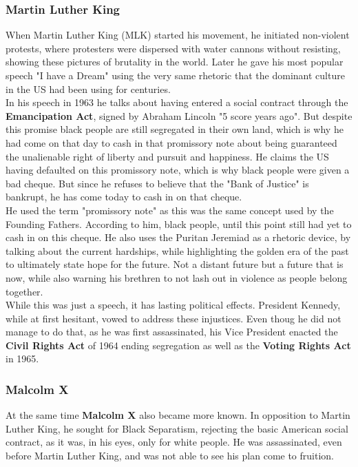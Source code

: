 \documentclass{article}
\begin{document}
	\subsubsection{Martin Luther King}
	When Martin Luther King (MLK) started his movement, he initiated non-violent protests, where protesters were dispersed with water cannons without resisting, showing these pictures of brutality in the world. Later he gave his most popular speech "I have a Dream" using the very same rhetoric that the dominant culture in the US had been using for centuries. \\
	In his speech in 1963 he talks about having entered a social contract through the \textbf{Emancipation Act}, signed by Abraham Lincoln "5 score years ago". But despite this promise black people are still segregated in their own land, which is why he had come on that day to cash in that promissory note about being guaranteed the unalienable right of liberty and pursuit and happiness. He claims the US having defaulted on this promissory note, which is why black people were given a bad cheque. But since he refuses to believe that the "Bank of Justice" is bankrupt, he has come today to cash in on that cheque. \\
	He used the term "promissory note" as this was the same concept used by the Founding Fathers. According to him, black people, until this point still had yet to cash in on this cheque. He also uses the Puritan Jeremiad as a rhetoric device, by talking about the current hardships, while highlighting the golden era of the past to ultimately state hope for the future. Not a distant future but a future that is now, while also warning his brethren to not lash out in violence as people belong together. \\
	While this was just a speech, it has lasting political effects. President Kennedy, while at first hesitant, vowed to address these injustices. Even thoug he did not manage to do that, as he was first assassinated, his Vice President enacted the \textbf{Civil Rights Act} of 1964 ending segregation as well as the \textbf{Voting Rights Act} in 1965. \\
	\subsubsection{Malcolm X}
	At the same time \textbf{Malcolm X} also became more known. In opposition to Martin Luther King, he sought for Black Separatism, rejecting the basic American social contract, as it was, in his eyes, only for white people. He was assassinated, even before Martin Luther King, and was not able to see his plan come to fruition. \\
\end{document}
